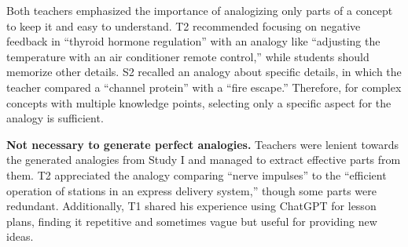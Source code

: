 Both teachers emphasized the importance of analogizing only parts of a concept to keep it  and easy to understand. 
 T2 recommended focusing on negative feedback in ``thyroid hormone regulation'' with an analogy like ``adjusting the temperature with an air conditioner remote control,'' while students should memorize other details. 
S2 recalled an analogy about specific details, in which the teacher compared a ``channel protein'' with a ``fire escape.''
Therefore, for complex concepts with multiple knowledge points, selecting only a specific aspect for the analogy is sufficient.


\textbf{Not necessary to generate perfect analogies.}
Teachers were lenient towards the generated analogies from Study I and managed to extract effective parts from them. 
T2 appreciated the analogy comparing ``nerve impulses'' to the ``efficient operation of stations in an express delivery system,'' though some parts were redundant. 
Additionally, T1 shared his experience using ChatGPT for lesson plans, finding it repetitive and sometimes vague but useful for providing new ideas.



